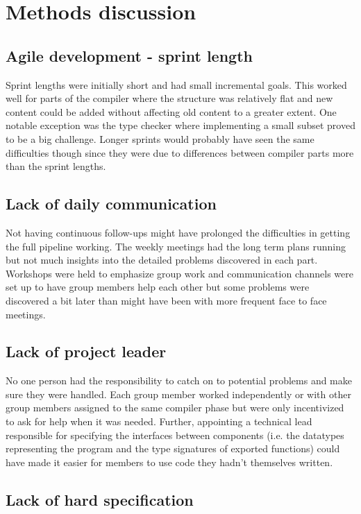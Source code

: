 \section{Methods discussion}

\subsection{Agile development - sprint length}

Sprint lengths were initially short and had small incremental goals. This worked well for parts of the compiler where the structure was relatively flat and new content could be added without affecting old content to a greater extent. One notable exception was the type checker where implementing a small subset proved to be a big challenge. Longer sprints would probably have seen the same difficulties though since they were due to differences between compiler parts more than the sprint lengths.

\subsection{Lack of daily communication}

Not having continuous follow-ups might have prolonged the difficulties in getting the full pipeline working. The weekly meetings had the long term plans running but not much insights into the detailed problems discovered in each part. Workshops were held to emphasize group work and communication channels were set up to have group members help each other but some problems were discovered a bit later than might have been with more frequent face to face meetings.

\subsection{Lack of project leader}

No one person had the responsibility to catch on to potential problems and make sure they were handled. Each group member worked independently or with other group members assigned to the same compiler phase but were only incentivized to ask for help when it was needed. Further, appointing a technical lead responsible for specifying the interfaces between components (i.e. the datatypes representing the program and the type signatures of exported functions) could have made it easier for members to use code they hadn’t themselves written.

\subsection{Lack of hard specification}

